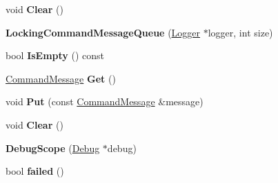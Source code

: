 \begin{DoxyCompactItemize}
\item 
void {\bfseries Clear} ()\hypertarget{classv8_1_1internal_1_1_b_a_s_e___e_m_b_e_d_d_e_d_ab116508b5f5cbaedc057424d77489933}{}\label{classv8_1_1internal_1_1_b_a_s_e___e_m_b_e_d_d_e_d_ab116508b5f5cbaedc057424d77489933}

\item 
{\bfseries Locking\+Command\+Message\+Queue} (\hyperlink{classv8_1_1internal_1_1_logger}{Logger} $\ast$logger, int size)\hypertarget{classv8_1_1internal_1_1_b_a_s_e___e_m_b_e_d_d_e_d_a93689fd6c07dccf0fe5127d5b0f9ff85}{}\label{classv8_1_1internal_1_1_b_a_s_e___e_m_b_e_d_d_e_d_a93689fd6c07dccf0fe5127d5b0f9ff85}

\item 
bool {\bfseries Is\+Empty} () const \hypertarget{classv8_1_1internal_1_1_b_a_s_e___e_m_b_e_d_d_e_d_a7b3920ce8dc8264975a0d2380dd7acd0}{}\label{classv8_1_1internal_1_1_b_a_s_e___e_m_b_e_d_d_e_d_a7b3920ce8dc8264975a0d2380dd7acd0}

\item 
\hyperlink{classv8_1_1internal_1_1_command_message}{Command\+Message} {\bfseries Get} ()\hypertarget{classv8_1_1internal_1_1_b_a_s_e___e_m_b_e_d_d_e_d_a7d96df9ce8956c4f00171a9954fe4a29}{}\label{classv8_1_1internal_1_1_b_a_s_e___e_m_b_e_d_d_e_d_a7d96df9ce8956c4f00171a9954fe4a29}

\item 
void {\bfseries Put} (const \hyperlink{classv8_1_1internal_1_1_command_message}{Command\+Message} \&message)\hypertarget{classv8_1_1internal_1_1_b_a_s_e___e_m_b_e_d_d_e_d_aa805a0549e4b57d97e4bd13c4332142c}{}\label{classv8_1_1internal_1_1_b_a_s_e___e_m_b_e_d_d_e_d_aa805a0549e4b57d97e4bd13c4332142c}

\item 
void {\bfseries Clear} ()\hypertarget{classv8_1_1internal_1_1_b_a_s_e___e_m_b_e_d_d_e_d_ab116508b5f5cbaedc057424d77489933}{}\label{classv8_1_1internal_1_1_b_a_s_e___e_m_b_e_d_d_e_d_ab116508b5f5cbaedc057424d77489933}

\item 
{\bfseries Debug\+Scope} (\hyperlink{classv8_1_1internal_1_1_debug}{Debug} $\ast$debug)\hypertarget{classv8_1_1internal_1_1_b_a_s_e___e_m_b_e_d_d_e_d_a5a132606abaf0e8e6e64a2b24f1b04ce}{}\label{classv8_1_1internal_1_1_b_a_s_e___e_m_b_e_d_d_e_d_a5a132606abaf0e8e6e64a2b24f1b04ce}

\item 
bool {\bfseries failed} ()\hypertarget{classv8_1_1internal_1_1_b_a_s_e___e_m_b_e_d_d_e_d_a600f599d1d65b90f09858376221fe817}{}\label{classv8_1_1internal_1_1_b_a_s_e___e_m_b_e_d_d_e_d_a600f599d1d65b90f09858376221fe817}


\end{DoxyCompactItemize}
